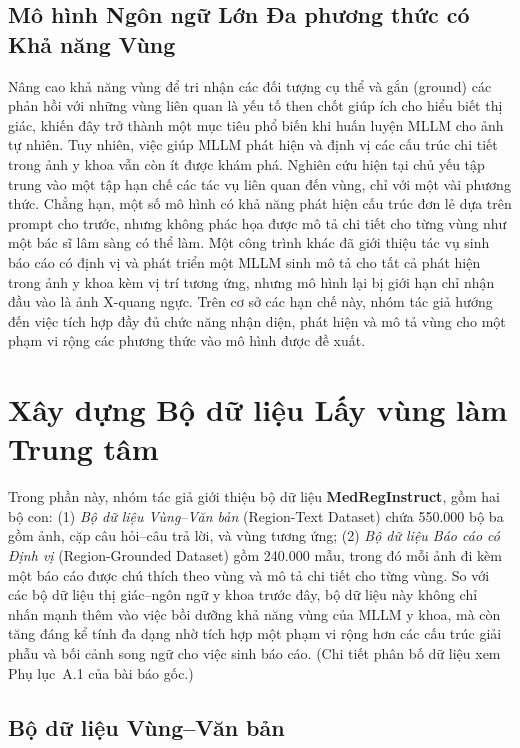\documentclass[12pt,a4paper,oneside]{extarticle}
\begin{document}
\subsection{Mô hình Ngôn ngữ Lớn Đa phương thức có Khả năng Vùng}

Nâng cao khả năng vùng để tri nhận các đối tượng cụ thể và gắn (ground) các phản hồi với những
vùng liên quan là yếu tố then chốt giúp ích cho hiểu biết thị giác, khiến đây trở thành một mục
tiêu phổ biến khi huấn luyện MLLM cho ảnh tự nhiên. Tuy nhiên, việc giúp MLLM phát hiện và định
vị các cấu trúc chi tiết trong ảnh y khoa vẫn còn ít được khám phá. Nghiên cứu hiện tại chủ yếu
tập trung vào một tập hạn chế các tác vụ liên quan đến vùng, chỉ với một vài phương thức. Chẳng
hạn, một số mô hình có khả năng phát hiện cấu trúc đơn lẻ dựa trên prompt cho trước, nhưng không
phác họa được mô tả chi tiết cho từng vùng như một bác sĩ lâm sàng có thể làm. Một công trình
khác đã giới thiệu tác vụ sinh báo cáo có định vị và phát triển một MLLM sinh mô tả cho tất cả
phát hiện trong ảnh y khoa kèm vị trí tương ứng, nhưng mô hình lại bị giới hạn chỉ nhận đầu vào
là ảnh X-quang ngực. Trên cơ sở các hạn chế này, nhóm tác giả hướng đến việc tích hợp đầy đủ
chức năng nhận diện, phát hiện và mô tả vùng cho một phạm vi rộng các phương thức vào mô hình
được đề xuất.

\section{Xây dựng Bộ dữ liệu Lấy vùng làm Trung tâm}

Trong phần này, nhóm tác giả giới thiệu bộ dữ liệu \textbf{MedRegInstruct}, gồm hai bộ con:
(1) \emph{Bộ dữ liệu Vùng--Văn bản} (Region-Text Dataset) chứa 550.000 bộ ba gồm ảnh, cặp
câu hỏi--câu trả lời, và vùng tương ứng; (2) \emph{Bộ dữ liệu Báo cáo có Định vị}
(Region-Grounded Dataset) gồm 240.000 mẫu, trong đó mỗi ảnh đi kèm một báo cáo được chú thích
theo vùng và mô tả chi tiết cho từng vùng. So với các bộ dữ liệu thị giác--ngôn ngữ y khoa
trước đây, bộ dữ liệu này không chỉ nhấn mạnh thêm vào việc bồi dưỡng khả năng vùng của MLLM y
khoa, mà còn tăng đáng kể tính đa dạng nhờ tích hợp một phạm vi rộng hơn các cấu trúc giải phẫu
và bối cảnh song ngữ cho việc sinh báo cáo. (Chi tiết phân bố dữ liệu xem Phụ lục~A.1 của bài
báo gốc.)

\subsection{Bộ dữ liệu Vùng--Văn bản}
\end{document}
